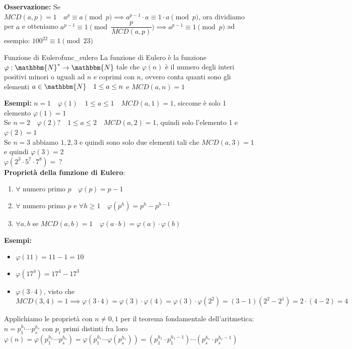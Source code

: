 \documentclass[12pt, letterpaper]{report}
\newcounter{definition}
\newcommand{\nmu}{}
\begin{document}
		\textbf{Osservazione:} Se $MCD(a,p) = 1 \quad a^p \equiv a \pmod{p} \implies a^{p-1} \cdot a \equiv 1 \cdot a \pmod{p}$, ora dividiamo per $a$ e otteniamo $a^{p-1} \equiv 1 \pmod{\dfrac{p}{MCD(a,p)}} \implies a^{p-1} \equiv 1 \pmod{p}$ ad esempio: $100^{22} \equiv 1 \pmod{23}$
		\begin{definition}{\nmu Funzione di Eulero}{func_eulero}
			La funzione di Eulero è la funzione $\varphi: \mathbbm{N}^* \to \mathbbm{N}$ tale che $\varphi(n)$ è il numero degli interi positivi minori o uguali ad $n$ e coprimi con $n$, ovvero conta quanti sono gli elementi $a \in \mathbbm{N} \quad 1 \leq a \leq n$ e $MCD(a,n) = 1$
		\end{definition}
		\textbf{Esempi:} $n = 1 \quad \varphi(1) \quad 1 \leq a \leq 1 \quad MCD(a, 1) = 1$, siccome è solo 1 elemento $\varphi(1) = 1$ \\
		Se $n = 2 \quad \varphi(2)? \quad 1 \leq a \leq 2 \quad MCD(a, 2) = 1$, quindi solo l'elemento 1 e $\varphi(2) = 1$ \\
		Se $n = 3$ abbiamo $1,2,3$ e quindi sono solo due elementi tali che $MCD(a, 3) = 1$ e quindi $\varphi(3) = 2$ \\
		$\varphi(2^3 \cdot 5^7 \cdot 7^8) =\ ?$ \\
		\textbf{Proprietà della funzione di Eulero}:
		\begin{enumerate}
			\item $\forall$ numero primo $p \quad \varphi(p) = p - 1$
			\item $\forall$ numero primo $p$ e $\forall h \geq 1 \quad \varphi(p^h) = p^h - p^{h - 1}$
			\item $\forall a,b$ se $MCD(a,b) = 1 \quad \varphi(a \cdot b) = \varphi(a) \cdot \varphi(b)$
		\end{enumerate}
		\textbf{Esempi:}
		\begin{itemize}
			\item $\varphi(11) = 11 - 1 = 10$
			\item $\varphi(17^4) = 17^4 - 17^3$
			\item $\varphi(3 \cdot 4)$, visto che $MCD(3,4) = 1 \implies \varphi(3 \cdot 4) = \varphi(3) \cdot \varphi(4) = \varphi(3) \cdot \varphi(2^2) = (3 - 1)(2^2 - 2^1) = 2\cdot(4 - 2) = 4$
		\end{itemize}
		Applichiamo le proprietà con $n \neq 0,1$ per il teorema fondamentale dell'aritmetica: $n = p_1^{h_1} \cdots p_s^{h_s}$ con $p_i$ primi distinti fra loro \\
		$\varphi(n) = \varphi( p_1^{h_1} \cdots p_s^{h_s}) = \varphi(p_1^{h_1} \cdots \varphi(p_s^{h_s})) = (p_1^{h_1} \cdot p_1^{h_1 - 1}) \cdots (p_s^{h_s} \cdot p_s^{h_s - 1})$ \\
\end{document}
